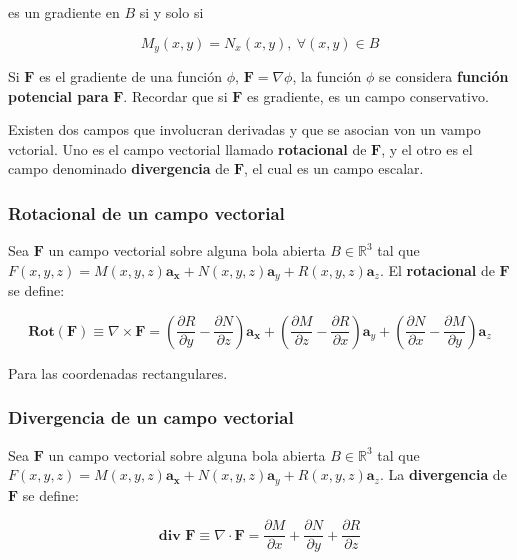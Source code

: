 es un gradiente en $B$ si y solo si

\begin{equation*}
M_y(x,y) = N_x(x,y), \ \forall (x,y) \in B
\end{equation*}

Si $\mathbf{F}$ es el gradiente de una función $\phi$, $\mathbf{F} = \nabla \phi$, la función $\phi$ se considera \textbf{función potencial para} $\mathbf{F}$. Recordar que si $\mathbf{F}$ es gradiente, es un campo conservativo.


Existen dos campos que involucran derivadas y que se asocian von un vampo vctorial. Uno es el campo vectorial llamado \textbf{rotacional} de $\mathbf{F}$, y el otro es el campo denominado \textbf{divergencia} de $\mathbf{F}$, el cual es un campo escalar.

\subsubsection{Rotacional de un campo vectorial}

Sea $\mathbf{F}$ un campo vectorial sobre alguna bola abierta $B \in \mathbb{R}^3$ tal que $F(x,y,z) = M(x,y,z) \mathbf{a_x} + N(x,y,z) \mathbf{a}_y + R(x,y,z) \mathbf{a}_z$. El \textbf{rotacional} de $\mathbf{F}$se define:

\begin{equation*}
\textbf{Rot} (\mathbf{F}) \equiv \nabla \times \mathbf{F} =  \left( \frac{\partial R }{\partial y } - \frac{\partial N }{\partial z } \right) \mathbf{a_x} + \left( \frac{\partial M }{\partial z } - \frac{\partial R }{\partial x } \right) \mathbf{a}_y + \left( \frac{\partial N }{\partial x } - \frac{\partial M }{\partial y } \right) \mathbf{a}_z
\end{equation*}

Para las coordenadas rectangulares.

\subsubsection{Divergencia de un campo vectorial}

Sea $\mathbf{F}$ un campo vectorial sobre alguna bola abierta $B \in \mathbb{R}^3$ tal que $F(x,y,z) = M(x,y,z) \mathbf{a_x} + N(x,y,z) \mathbf{a}_y + R(x,y,z) \mathbf{a}_z$. La \textbf{divergencia} de $\mathbf{F}$ se define:

\begin{equation*}
\textbf{div } \mathbf{F} \equiv \nabla \cdot \mathbf{F} = \frac{ \partial M }{ \partial x } + \frac{ \partial N }{ \partial y } + \frac{ \partial R }{ \partial z }
\end{equation*}

